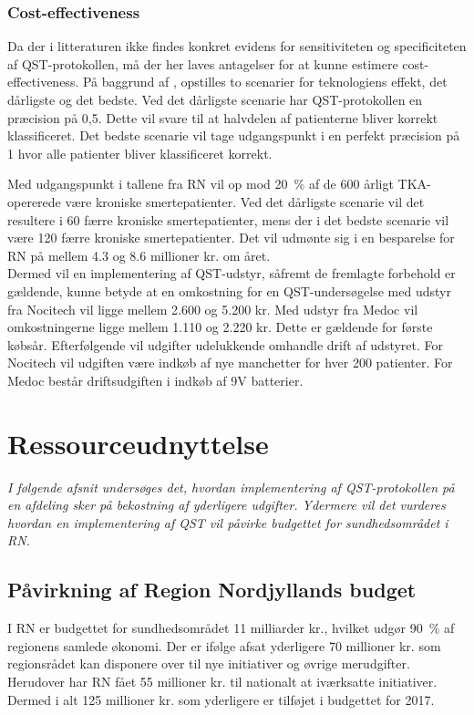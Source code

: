 \subsubsection{Cost-effectiveness}
Da der i litteraturen ikke findes konkret evidens for sensitiviteten og specificiteten af QST-protokollen, må der her laves antagelser for at kunne estimere cost-effectiveness. På baggrund af , opstilles to scenarier for teknologiens effekt, det dårligste og det bedste. Ved det dårligste scenarie har QST-protokollen en præcision på 0,5. Dette vil svare til at halvdelen af patienterne bliver korrekt klassificeret. Det bedste scenarie vil tage udgangspunkt i en perfekt præcision på 1 hvor alle patienter bliver klassificeret korrekt.

Med udgangspunkt i tallene fra RN vil op mod 20~\% af de 600 årligt TKA-opererede være kroniske smertepatienter. Ved det dårligste scenarie vil det resultere i 60 færre kroniske smertepatienter, mens der i det bedste scenarie vil være 120 færre kroniske smertepatienter. Det vil udmønte sig i en besparelse for RN på mellem 4.3 og 8.6 millioner kr. om året. \\
Dermed vil en implementering af QST-udstyr, såfremt de fremlagte forbehold er gældende, kunne betyde at en omkostning for en QST-undersøgelse med udstyr fra Nocitech vil ligge mellem 2.600 og 5.200 kr. Med udstyr fra Medoc vil omkostningerne ligge mellem 1.110 og 2.220 kr. Dette er gældende for første købsår. Efterfølgende vil udgifter udelukkende omhandle drift af udstyret. For Nocitech vil udgiften være indkøb af nye manchetter for hver 200 patienter. For Medoc består driftsudgiften i indkøb af 9V batterier. 

\section{Ressourceudnyttelse}
\textit{I følgende afsnit undersøges det, hvordan implementering af QST-protokollen på en afdeling sker på bekostning af yderligere udgifter. Ydermere vil det vurderes hvordan en implementering af QST vil påvirke budgettet for sundhedsområdet i RN.}

\subsection{Påvirkning af Region Nordjyllands budget}
I RN er budgettet for sundhedsområdet 11 milliarder kr., hvilket udgør 90~\% af regionens samlede økonomi. \citep{RnBudget17} Der er ifølge  afsat yderligere 70 millioner kr. som regionsrådet kan disponere over til nye initiativer og øvrige merudgifter. Herudover har RN fået 55 millioner kr. til nationalt at iværksatte initiativer. Dermed i alt 125 millioner kr. som yderligere er tilføjet i budgettet for 2017.

